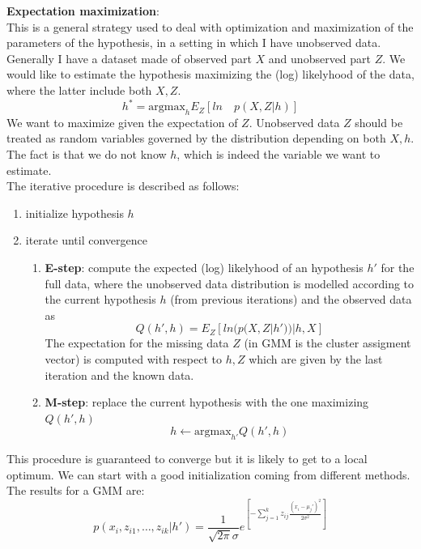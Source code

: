             \textbf{Expectation maximization}:\\
            This is a general strategy used to deal with optimization and maximization of the parameters of the hypothesis, in a setting in which I have unobserved data. Generally I have a dataset made of observed part $X$ and unobserved part $Z$.
            We would like to estimate the hypothesis maximizing the (log) likelyhood of the data, where the latter include both $X, Z$. 
            $$h^* = \text{argmax}_h E_Z [ln \quad p(X, Z | h)]$$
            We want to maximize given the expectation of $Z$. Unobserved data $Z$ should be treated as random variables governed by the distribution depending on both $X, h$. The fact is that we do not know $h$, which is indeed the variable we want to estimate.\\
            The iterative procedure is described as follows:
            \begin{enumerate}
                \item initialize hypothesis $h$
                \item iterate until convergence
                \begin{enumerate}
                    \item \textbf{E-step}: compute the expected (log) likelyhood of an hypothesis $h'$ for the full data, where the unobserved data distribution is modelled according to the current hypothesis $h$ (from previous iterations) and the observed data as
                    $$Q(h', h) = E_Z[ln (p(X, Z | h'))|h, X]$$
                    The expectation for the missing data $Z$ (in GMM is the cluster assigment vector) is computed with respect to $h, Z$ which are given by the last iteration and the known data.
                    \item \textbf{M-step}: replace the current hypothesis with the one maximizing $Q(h', h)$
                    $$h \leftarrow \text{argmax}_{h'} Q(h', h)$$
                \end{enumerate}
            \end{enumerate}

            This procedure is guaranteed to converge but it is likely to get to a local optimum. We can start with a good initialization coming from different methods. \\

            The results for a GMM are:
            $$p(x_i, z_{i1}, \dots, z_{ik} | h') = 
            \frac{1}{\sqrt{2 \pi} \sigma}       
            e^ {
            \left[ 
                - \sum _{j=1} ^k z_{ij} \frac{(x_i - \mu_j ') ^2}{2 \sigma ^2}
            \right]}
            $$

